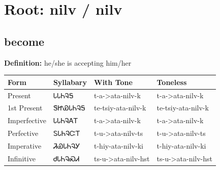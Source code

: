\documentclass{article}%
\begin{document}
%
\normalsize%
\section*{Root: nilv / nilv}%
\subsection*{become}%
\textbf{Definition: }%
he/she is accepting him/her%
\\[0.5em]%
\begin{tabular}{|l|l|l|l|}%
\hline%
\textbf{Form}&\textbf{Syllabary}&\textbf{With Tone}&\textbf{Toneless}\\%
\hline%
Present&ᏓᏓᏂᎸᎦ&t{-}a{-}>ata{-}nilv{-}k&t{-}a{-}>ata{-}nilv{-}k\\%
1st Present&ᏕᏥᏯᏓᏂᎸᎦ&te{-}tsiy{-}ata{-}nilv{-}k&te{-}tsiy{-}ata{-}nilv{-}k\\%
Imperfective&ᏓᏓᏂᎸᎪᎢ&t{-}a{-}>ata{-}nilv{-}k&t{-}a{-}>ata{-}nilv{-}k\\%
Perfective&ᏚᏓᏂᎸᏨᎢ&t{-}u{-}>ata{-}nilv{-}ts&t{-}u{-}>ata{-}nilv{-}ts\\%
Imperative&ᏘᏯᏓᏂᎸᎩ&t{-}hiy{-}ata{-}nilv{-}ki&t{-}hiy{-}ata{-}nilv{-}ki\\%
Infinitive&ᏧᏓᏂᎸᏍᏗ&ts{-}u{-}>ata{-}nilv{-}hst&ts{-}u{-}>ata{-}nilv{-}hst\\%
\hline%
\end{tabular}%
\\[1em]%
\end{document}

